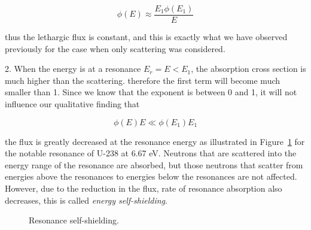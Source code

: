 $$\phi(E) \approx \frac{E_1\phi(E_1)}{E}$$

\noindent thus the lethargic flux is constant, and this is exactly what we have observed previously for the case when only scattering was considered.

2. When the energy is at a resonance $E_r=E<E_1$, the absorption cross section is much higher than the scattering. therefore the first term will become much smaller than 1. Since we know that the exponent is between 0 and 1, it will not influence our qualitative finding that 

$$\phi(E)E \ll \phi(E_1)E_1$$

\noindent the flux is greatly decreased at the resonance energy as illustrated in Figure~\ref{fig:selfshielding} for the notable resonance of U-238 at 6.67 eV. Neutrons that are scattered into the energy range of the resonance are absorbed, but those neutrons that scatter from energies above the resonances to energies below the resonances are not affected. However, due to the reduction in the flux, rate of resonance absorption also decreases, this is called \textit{energy self-shielding}.

\begin{figure}[ht!]
\protect {}\protect
\caption{\label{fig:selfshielding} \footnotesize{Resonance self-shielding.}}
\end{figure}
 
